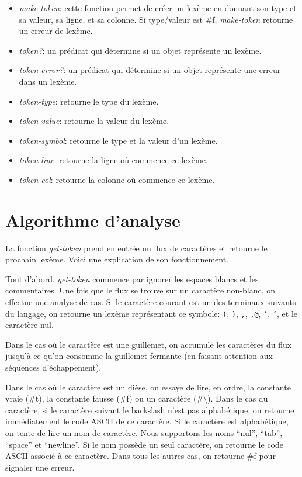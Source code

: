 \documentclass[11pt]{report}
\begin{document}
\begin{itemize}
\item \emph{make-token}: cette fonction permet de créer un lexème en
  donnant son type et sa valeur, sa ligne, et sa colonne.  Si
  type/valeur est \#f, \emph{make-token} retourne un erreur de lexème.
\item \emph{token?}: un prédicat qui détermine si un objet représente
  un lexème.
\item \emph{token-error?}: un prédicat qui détermine si un objet
  représente une erreur dans un lexème.
\item \emph{token-type}: retourne le type du lexème.
\item \emph{token-value}: retourne la valeur du lexème.
\item \emph{token-symbol}: retourne le type et la valeur d'un lexème.
\item \emph{token-line}: retourne la ligne où commence ce lexème.
\item \emph{token-col}: retourne la colonne où commence ce lexème.
\end{itemize}

\section{Algorithme d'analyse}

La fonction \emph{get-token} prend en entrée un flux de caractères et
retourne le prochain lexème.  Voici une explication de son
fonctionnement.

Tout d'abord, \emph{get-token} commence par ignorer les espaces blancs
et les commentaires.  Une fois que le flux se trouve sur un caractère
non-blanc, on effectue une analyse de cas.  Si le caractère courant
est un des terminaux suivants du langage, on retourne un lexème
représentant ce symbole: \texttt{(}, \texttt{)}, \texttt{,},
\texttt{,@}, \texttt{'}, \texttt{`}, et le caractère nul.

Dans le cas où le caractère est une guillemet, on accumule les
caractères du flux jusqu'à ce qu'on consomme la guillemet fermante (en
faisant attention aux séquences d'échappement).

Dans le cas où le caractère est un dièse, on essaye de lire, en ordre,
la constante vraie (\#t), la constante fausse (\#f) ou un caractère
(\#\textbackslash).  Dans le cas du caractère, si le caractère suivant
le backslash n'est pas alphabétique, on retourne immédiatement le code
ASCII de ce caractère.  Si le caractère est alphabétique, on tente de
lire un nom de caractère.  Nous supportons les noms ``nul'', ``tab'',
``space'' et ``newline''.  Si le nom possède un seul caractère, on
retourne le code ASCII associé à ce caractère.  Dans tous les autres
cas, on retourne \#f pour signaler une erreur.
\end{document}
